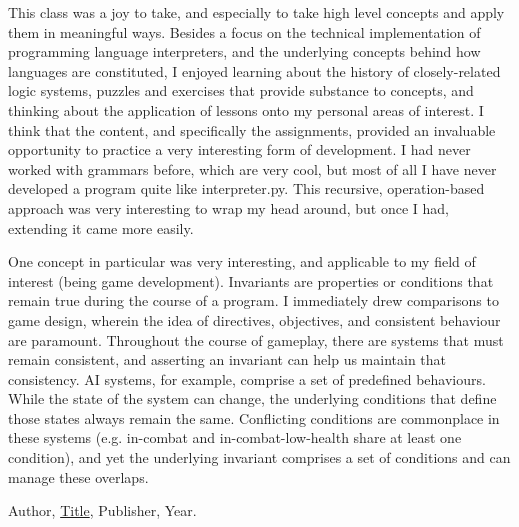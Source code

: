 \documentclass{article}
\theoremstyle{theorem}
\theoremstyle{definition}
\theoremstyle{remark}
\begin{document}
This class was a joy to take, and especially to take high level concepts and apply them in meaningful ways. Besides a focus on the technical implementation of programming language interpreters, and the underlying concepts behind how languages are constituted, I enjoyed learning about the history of closely-related logic systems, puzzles and exercises that provide substance to concepts, and thinking about the application of lessons onto my personal areas of interest. I think that the content, and specifically the assignments, provided an invaluable opportunity to practice a very interesting form of development. I had never worked with grammars before, which are very cool, but most of all I have never developed a program quite like interpreter.py. This recursive, operation-based approach was very interesting to wrap my head around, but once I had, extending it came more easily. 

One concept in particular was very interesting, and applicable to my field of interest (being game development). Invariants are properties or conditions that remain true during the course of a program. I immediately drew comparisons to game design, wherein the idea of directives, objectives, and consistent behaviour are paramount. Throughout the course of gameplay, there are systems that must remain consistent, and asserting an invariant can help us maintain that consistency. AI systems, for example, comprise a set of predefined behaviours. While the state of the system can change, the underlying conditions that define those states always remain the same. Conflicting conditions are commonplace in these systems (e.g. in-combat and in-combat-low-health share at least one condition), and yet the underlying invariant comprises a set of conditions and can manage these overlaps.


\begin{thebibliography}{99}
 Author, \href{https://en.wikipedia.org/wiki/LaTeX}{Title}, Publisher, Year.
\end{thebibliography}
\end{document}
